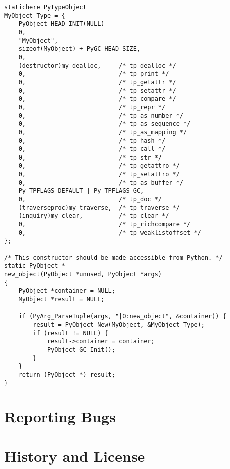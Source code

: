 \documentclass{manual}
\begin{document}
\begin{verbatim}
statichere PyTypeObject
MyObject_Type = {
    PyObject_HEAD_INIT(NULL)
    0,
    "MyObject",
    sizeof(MyObject) + PyGC_HEAD_SIZE,
    0,
    (destructor)my_dealloc,     /* tp_dealloc */
    0,                          /* tp_print */
    0,                          /* tp_getattr */
    0,                          /* tp_setattr */
    0,                          /* tp_compare */
    0,                          /* tp_repr */
    0,                          /* tp_as_number */
    0,                          /* tp_as_sequence */
    0,                          /* tp_as_mapping */
    0,                          /* tp_hash */
    0,                          /* tp_call */
    0,                          /* tp_str */
    0,                          /* tp_getattro */
    0,                          /* tp_setattro */
    0,                          /* tp_as_buffer */
    Py_TPFLAGS_DEFAULT | Py_TPFLAGS_GC,
    0,                          /* tp_doc */
    (traverseproc)my_traverse,  /* tp_traverse */
    (inquiry)my_clear,          /* tp_clear */
    0,                          /* tp_richcompare */
    0,                          /* tp_weaklistoffset */
};

/* This constructor should be made accessible from Python. */
static PyObject *
new_object(PyObject *unused, PyObject *args)
{
    PyObject *container = NULL;
    MyObject *result = NULL;

    if (PyArg_ParseTuple(args, "|O:new_object", &container)) {
        result = PyObject_New(MyObject, &MyObject_Type);
        if (result != NULL) {
            result->container = container;
            PyObject_GC_Init();
        }
    }
    return (PyObject *) result;
}
\end{verbatim}


%


\appendix
\chapter{Reporting Bugs}


\chapter{History and License}


\end{document}
